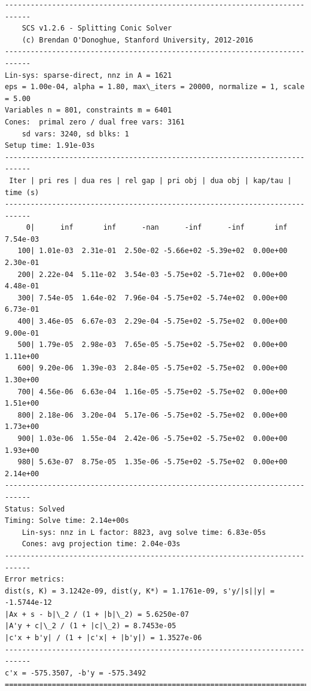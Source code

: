 \documentclass[11pt]{article}
\begin{document}
    \begin{Verbatim}[commandchars=\\\{\}]
----------------------------------------------------------------------------
	SCS v1.2.6 - Splitting Conic Solver
	(c) Brendan O'Donoghue, Stanford University, 2012-2016
----------------------------------------------------------------------------
Lin-sys: sparse-direct, nnz in A = 1621
eps = 1.00e-04, alpha = 1.80, max\_iters = 20000, normalize = 1, scale = 5.00
Variables n = 801, constraints m = 6401
Cones:	primal zero / dual free vars: 3161
	sd vars: 3240, sd blks: 1
Setup time: 1.91e-03s
----------------------------------------------------------------------------
 Iter | pri res | dua res | rel gap | pri obj | dua obj | kap/tau | time (s)
----------------------------------------------------------------------------
     0|      inf       inf      -nan      -inf      -inf       inf  7.54e-03 
   100| 1.01e-03  2.31e-01  2.50e-02 -5.66e+02 -5.39e+02  0.00e+00  2.30e-01 
   200| 2.22e-04  5.11e-02  3.54e-03 -5.75e+02 -5.71e+02  0.00e+00  4.48e-01 
   300| 7.54e-05  1.64e-02  7.96e-04 -5.75e+02 -5.74e+02  0.00e+00  6.73e-01 
   400| 3.46e-05  6.67e-03  2.29e-04 -5.75e+02 -5.75e+02  0.00e+00  9.00e-01 
   500| 1.79e-05  2.98e-03  7.65e-05 -5.75e+02 -5.75e+02  0.00e+00  1.11e+00 
   600| 9.20e-06  1.39e-03  2.84e-05 -5.75e+02 -5.75e+02  0.00e+00  1.30e+00 
   700| 4.56e-06  6.63e-04  1.16e-05 -5.75e+02 -5.75e+02  0.00e+00  1.51e+00 
   800| 2.18e-06  3.20e-04  5.17e-06 -5.75e+02 -5.75e+02  0.00e+00  1.73e+00 
   900| 1.03e-06  1.55e-04  2.42e-06 -5.75e+02 -5.75e+02  0.00e+00  1.93e+00 
   980| 5.63e-07  8.75e-05  1.35e-06 -5.75e+02 -5.75e+02  0.00e+00  2.14e+00 
----------------------------------------------------------------------------
Status: Solved
Timing: Solve time: 2.14e+00s
	Lin-sys: nnz in L factor: 8823, avg solve time: 6.83e-05s
	Cones: avg projection time: 2.04e-03s
----------------------------------------------------------------------------
Error metrics:
dist(s, K) = 3.1242e-09, dist(y, K*) = 1.1761e-09, s'y/|s||y| = -1.5744e-12
|Ax + s - b|\_2 / (1 + |b|\_2) = 5.6250e-07
|A'y + c|\_2 / (1 + |c|\_2) = 8.7453e-05
|c'x + b'y| / (1 + |c'x| + |b'y|) = 1.3527e-06
----------------------------------------------------------------------------
c'x = -575.3507, -b'y = -575.3492
============================================================================

    \end{Verbatim}
\end{document}
